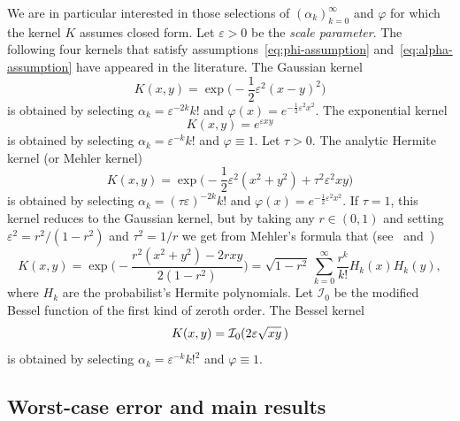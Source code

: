 \documentclass{mcom-l}
\numberwithin{equation}{section}
\numberwithin{theorem}{section} %
\begin{document}
We are in particular interested in those selections of $(\alpha_k)_{k=0}^\infty$ and $\varphi$ for which the kernel $K$ assumes closed form.
Let $\varepsilon > 0$ be the \emph{scale parameter}.
The following four kernels that satisfy assumptions~\eqref{eq:phi-assumption} and~\eqref{eq:alpha-assumption} have appeared in the literature.
  The Gaussian kernel
  \begin{equation} \label{eq:gaussian-kernel-intro}
    K(x, y) = \exp\bigg(\! -\frac{1}{2} \varepsilon^2 (x - y)^2 \bigg)
  \end{equation}
  is obtained by selecting $\alpha_k = \varepsilon^{-2k} k!$ and $\varphi(x) = e^{-\frac{1}{2}\varepsilon^2 x^2}$.
  The exponential kernel
  \begin{equation*}
    K(x, y) = e^{\varepsilon xy}
  \end{equation*}
  is obtained by selecting $\alpha_k = \varepsilon^{-k} k!$ and $\varphi \equiv 1$.
  Let $\tau > 0$.
  The analytic Hermite kernel (or Mehler kernel)
  \begin{equation*}
    K(x, y) = \exp\bigg( \! - \frac{1}{2} \varepsilon^2(x^2 + y^2)  + \tau^2 \varepsilon^2 xy \bigg)
  \end{equation*}
  is obtained by selecting $\alpha_k = (\tau \varepsilon)^{-2k} k!$ and $\varphi(x) = e^{-\frac{1}{2} \varepsilon^2 x^2}$.
  If $\tau = 1$, this kernel reduces to the Gaussian kernel, but by taking any $r \in (0, 1)$ and setting $\varepsilon^2 = r^2/(1 - r^2)$ and $\tau^2 = 1/r$ we get from Mehler's formula that (see~\cite[Sec.\@~3.1.2]{IrrgeherLeobacher2015} and~\cite[Sec.\@~5.2]{Karvonen2022-sample})
  \begin{equation*}
    K(x, y) = \exp\bigg( \! - \frac{r^2(x^2 + y^2) - 2rxy}{2(1 - r^2)} \bigg) = \sqrt{1 - r^2} \, \sum_{k=0}^\infty \frac{r^k}{k!} H_k(x) H_k(y),
  \end{equation*}
  where $H_k$ are the probabilist's Hermite polynomials.
  Let $\mathcal{I}_0$ be the modified Bessel function of the first kind of zeroth order.
  The Bessel kernel~\cite[p.\@~64]{Zwicknagl2009}
  \begin{equation*}
    K(x, y) = \mathcal{I}_0( 2 \varepsilon \sqrt{\smash[b]{x y}} \, )
  \end{equation*}
  is obtained by selecting $\alpha_k = \varepsilon^{-k} k!^2$ and $\varphi \equiv 1$.

\subsection{Worst-case error and main results}
\end{document}
